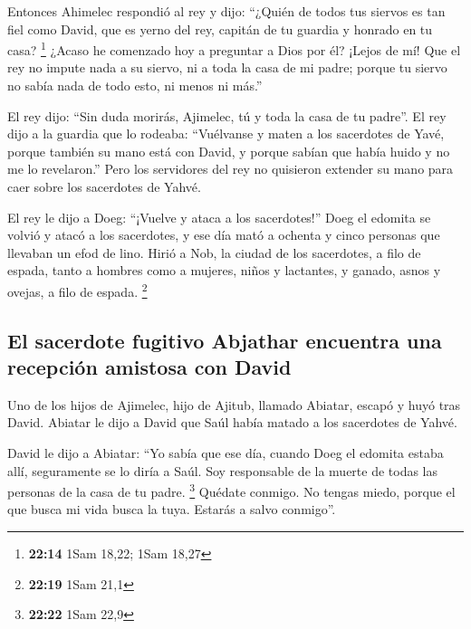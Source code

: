 \begin{paracol}{2}
 Entonces Ahimelec respondió al rey y dijo: ``¿Quién de
todos tus siervos es tan fiel como David, que es yerno del rey, capitán
de tu guardia y honrado en tu casa? \footnote{\textbf{22:14} 1Sam 18,22;
  1Sam 18,27}  ¿Acaso he comenzado hoy a preguntar a Dios
por él? ¡Lejos de mí! Que el rey no impute nada a su siervo, ni a toda
la casa de mi padre; porque tu siervo no sabía nada de todo esto, ni
menos ni más.''

 El rey dijo: ``Sin duda morirás, Ajimelec, tú y toda la
casa de tu padre''.  El rey dijo a la guardia que lo
rodeaba: ``Vuélvanse y maten a los sacerdotes de Yavé, porque también su
mano está con David, y porque sabían que había huido y no me lo
revelaron.'' Pero los servidores del rey no quisieron extender su mano
para caer sobre los sacerdotes de Yahvé.

 El rey le dijo a Doeg: ``¡Vuelve y ataca a los
sacerdotes!'' Doeg el edomita se volvió y atacó a los sacerdotes, y ese
día mató a ochenta y cinco personas que llevaban un efod de lino.
 Hirió a Nob, la ciudad de los sacerdotes, a filo de
espada, tanto a hombres como a mujeres, niños y lactantes, y ganado,
asnos y ovejas, a filo de espada. \footnote{\textbf{22:19} 1Sam 21,1}

\hypertarget{el-sacerdote-fugitivo-abjathar-encuentra-una-recepciuxf3n-amistosa-con-david}{%
\subsection{El sacerdote fugitivo Abjathar encuentra una recepción
amistosa con
David}\label{el-sacerdote-fugitivo-abjathar-encuentra-una-recepciuxf3n-amistosa-con-david}}

 Uno de los hijos de Ajimelec, hijo de Ajitub, llamado
Abiatar, escapó y huyó tras David.  Abiatar le dijo a
David que Saúl había matado a los sacerdotes de Yahvé.

 David le dijo a Abiatar: ``Yo sabía que ese día, cuando
Doeg el edomita estaba allí, seguramente se lo diría a Saúl. Soy
responsable de la muerte de todas las personas de la casa de tu padre.
\footnote{\textbf{22:22} 1Sam 22,9}  Quédate conmigo. No
tengas miedo, porque el que busca mi vida busca la tuya. Estarás a salvo
conmigo''.

\switchcolumn
\begin{otherlanguage}{english}

\hypertarget{section-43}{%
}
\end{otherlanguage}
\end{paracol}
